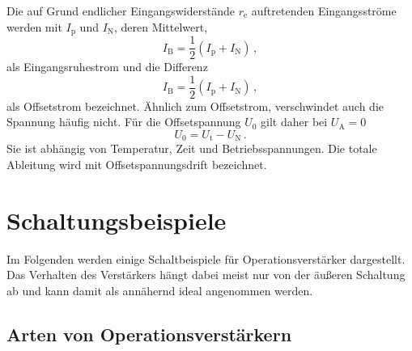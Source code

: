 Die auf Grund endlicher Eingangswiderstände $r_\text{e}$ auftretenden
Eingangsströme werden mit $I_\text{p}$ und $I_\text{N}$, deren
Mittelwert,
\begin{equation}
\label{eq:eingangsruhestrom}
    I_\text{B} = \frac{1}{2}\left(I_\text{p} + I_\text{N}\right)\,,
\end{equation}
als Eingangsruhestrom und die Differenz
\begin{equation}
\label{eq:offsetstrom}
    I_\text{B} = \frac{1}{2}\left(I_\text{p} + I_\text{N}\right)\,,
\end{equation}
als Offsetstrom bezeichnet.
Ähnlich zum Offsetstrom, verschwindet auch die Spannung häufig nicht.
Für die Offsetspannung $U_0$ gilt daher bei $U_\text{A} = 0$
\begin{equation}
\label{eq:offsetspannung}
    U_0 = U_\text{t} - U_\text{N}\,.
\end{equation}
Sie ist abhängig von Temperatur, Zeit und Betriebsspannungen. Die totale
Ableitung wird mit Offsetspannungsdrift bezeichnet.


\section{Schaltungsbeispiele}
\label{sec:schaltungsbeispiele}
Im Folgenden werden einige Schaltbeispiele für Operationsverstärker
dargestellt. Das Verhalten des Verstärkers hängt dabei meist nur von der
äußeren Schaltung ab und kann damit als annähernd ideal angenommen werden.

\subsection{Arten von Operationsverstärkern}


